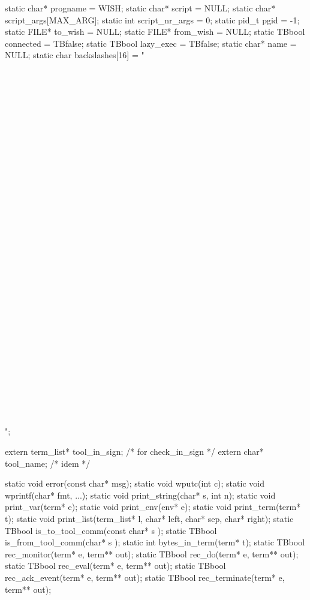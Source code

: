 \nwenddocs{}\endmoddef
static char*  progname             = WISH;
static char*  script               = NULL;
static char*  script_args[MAX_ARG];
static int    script_nr_args       = 0;
static pid_t  pgid                 = -1;
static FILE*  to_wish              = NULL;
static FILE*  from_wish            = NULL;
static TBbool connected            = TBfalse;
static TBbool lazy_exec            = TBfalse;
static char*  name                 = NULL;
static char   backslashes[16]      = "\\\\\\\\\\\\\\\\\\\\\\\\\\\\\\\\\\\\\\\\\\\\\\\\\\\\\\\\\\\\\\\\";

extern term_list* tool_in_sign; /* for check_in_sign */
extern char*      tool_name;    /* idem */
\nwendcode{}\nwdocspar


\nwenddocs{}\endmoddef
static void error(const char* msg);
static void wputc(int c);
static void wprintf(char* fmt, ...);
static void print_string(char* s, int n);
static void print_var(term* e);
static void print_env(env* e);
static void print_term(term* t);
static void print_list(term_list* l, char* left, char* sep, char* right);
static TBbool is_to_tool_comm(const char* s );
static TBbool is_from_tool_comm(char* s );
static int bytes_in_term(term* t);
static TBbool rec_monitor(term* e, term** out);
static TBbool rec_do(term* e, term** out);
static TBbool rec_eval(term* e, term** out);
static TBbool rec_ack_event(term* e, term** out);
static TBbool rec_terminate(term* e, term** out);

